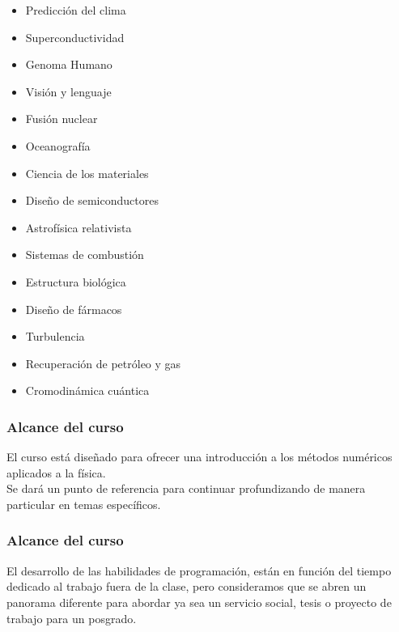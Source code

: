 \begin{frame}
\fontsize{14}{14}\selectfont
\begin{multicols}{2}
\begin{itemize}[<+->]
	\item Predicción del clima
	\item Superconductividad
	\item Genoma Humano
	\item Visión y lenguaje
	\item Fusión nuclear
	\item Oceanografía
	\item Ciencia de los materiales
	\item Diseño de semiconductores
	\item Astrofísica relativista
	\item Sistemas de combustión
	\item Estructura biológica
	\item Diseño de fármacos
	\item Turbulencia
	\item Recuperación de petróleo y gas
	\item Cromodinámica cuántica
\end{itemize}
\end{multicols}
\end{frame}
\begin{frame}
\frametitle{Alcance del curso}
El curso está diseñado para ofrecer una introducción a los métodos numéricos aplicados a la física.
\\
\medskip
Se dará un punto de referencia para continuar profundizando de manera particular en temas específicos. 
\end{frame}
\begin{frame}
\frametitle{Alcance del curso}
El desarrollo de las habilidades de programación, están en función del tiempo dedicado al trabajo fuera de la clase, pero consideramos que se abren un panorama diferente para abordar ya sea un servicio social, tesis o proyecto de trabajo para un posgrado.
\end{frame}
